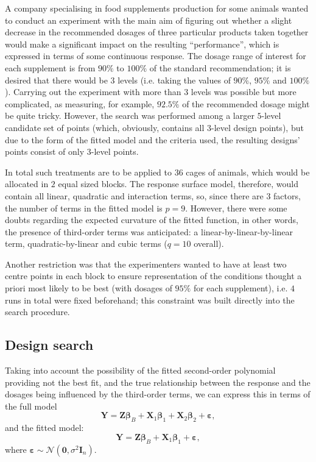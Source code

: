 A company specialising in food supplements production for some animals wanted to conduct an experiment with the main aim of figuring out whether a slight decrease in the recommended dosages of three particular products taken together would make a significant impact on the resulting ``performance'', which is expressed in terms of some continuous response. The dosage range of interest for each supplement is from $90\%$ to $100\%$ of the standard recommendation; it is desired that there would be $3$ levels (i.e. taking the values of $90\%$, $95\%$ and $100\%$). Carrying out the experiment with more than $3$ levels was possible but more complicated, as measuring, for example, $92.5\%$ of the recommended dosage might be quite tricky. However, the search was performed among a larger $5$-level candidate set of points (which, obviously, contains all $3$-level design points), but due to the form of the fitted model and the criteria used, the resulting designs' points consist of only $3$-level points.

In total such treatments are to be applied to $36$ cages of animals, which would be allocated in $2$ equal sized blocks. The response surface model, therefore, would contain all linear, quadratic and interaction terms, so, since there are $3$ factors, the number of terms in the fitted model is $p=9$.  However, there were some doubts regarding the expected curvature of the fitted function, in other words, the presence of third-order terms was anticipated: a linear-by-linear-by-linear term, quadratic-by-linear and cubic terms ($q=10$ overall). 

Another restriction was that the experimenters wanted to have at least two centre points in each block to ensure representation of the conditions thought a priori most likely to be best (with dosages of $95\%$ for each supplement), i.e. $4$ runs in total were fixed beforehand; this constraint was built directly into the search procedure.

\subsection{Design search}

Taking into account the possibility of the fitted second-order polynomial providing not the best fit, and the true relationship between the response and the dosages being influenced by the third-order terms, we can express this in terms of the full model
\begin{equation*}
\bm{Y}=\bm{Z\beta}_{B}+\bm{X}_{1}\bm{\beta}_{1}+\bm{X}_{2}\bm{\beta}_{2}+\bm{\varepsilon},
\end{equation*}
and the fitted model: 
\begin{equation*}
\bm{Y}=\bm{Z\beta}_{B}+\bm{X}_{1}\bm{\beta}_{1}+\bm{\varepsilon},
\end{equation*}
where $\bm{\varepsilon}\sim \mathcal{N}(\bm{0},\sigma^{2}\bm{I}_{n}).$

